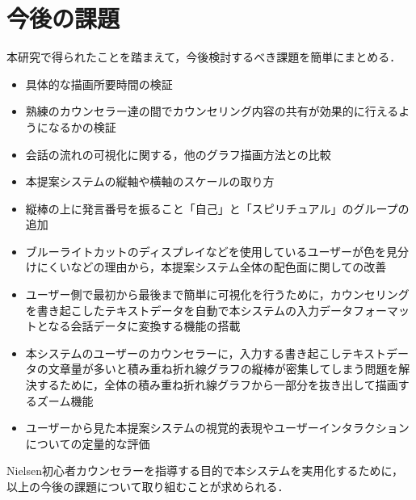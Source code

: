 \documentclass[shuuron]{kuee}
\begin{document}
\section{今後の課題}

本研究で得られたことを踏まえて，今後検討するべき課題を簡単にまとめる．

\begin{itemize}
\item 具体的な描画所要時間の検証
\item 熟練のカウンセラー達の間でカウンセリング内容の共有が効果的に行えるようになるかの検証
\item 会話の流れの可視化に関する，他のグラフ描画方法との比較
\item 本提案システムの縦軸や横軸のスケールの取り方
\item 縦棒の上に発言番号を振ること「自己」と「スピリチュアル」のグループの追加
\item ブルーライトカットのディスプレイなどを使用しているユーザーが色を見分けにくいなどの理由から，本提案システム全体の配色面に関しての改善
\item ユーザー側で最初から最後まで簡単に可視化を行うために，カウンセリングを書き起こしたテキストデータを自動で本システムの入力データフォーマットとなる会話データに変換する機能の搭載
\item 本システムのユーザーのカウンセラーに，入力する書き起こしテキストデータの文章量が多いと積み重ね折れ線グラフの縦棒が密集してしまう問題を解決するために，全体の積み重ね折れ線グラフから一部分を抜き出して描画するズーム機能
\item ユーザーから見た本提案システムの視覚的表現やユーザーインタラクションについての定量的な評価
\end{itemize}

Nielsen初心者カウンセラーを指導する目的で本システムを実用化するために，以上の今後の課題について取り組むことが求められる．%
\end{document}
